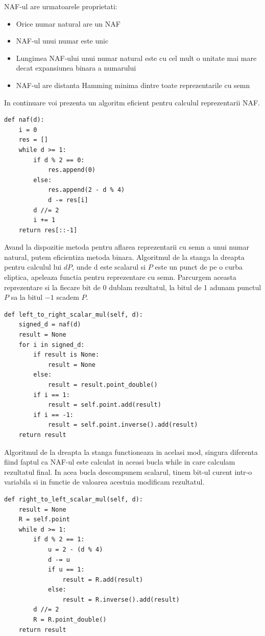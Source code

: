 \begin{teo}
NAF-ul are urmatoarele proprietati:
\begin{itemize}
  \item Orice numar natural are un NAF
  \item NAF-ul unui numar este unic
  \item Lungimea NAF-ului unui numar natural este cu cel mult o unitate mai mare decat expansiunea binara a numarului 
  \item NAF-ul are distanta Hamming minima dintre toate reprezentarile cu semn
\end{itemize}
\end{teo}

In continuare voi prezenta un algoritm eficient pentru calculul reprezentarii NAF.

\begin{lstlisting}
def naf(d):
    i = 0
    res = []
    while d >= 1:
        if d % 2 == 0:
            res.append(0)
        else:
            res.append(2 - d % 4)
            d -= res[i]
        d //= 2
        i += 1
    return res[::-1]
\end{lstlisting}

Avand la dispozitie metoda pentru aflarea reprezentarii cu semn a unui numar natural, putem eficientiza metoda binara. Algoritmul de la stanga la dreapta pentru calculul lui $dP$, unde d este scalarul si $P$ este un punct de pe o curba eliptica, apeleaza functia pentru reprezentare cu semn. Parcurgem aceasta reprezentare si la fiecare bit de 0 dublam rezultatul, la bitul de 1 adunam punctul $P$ sa la bitul $-1$ scadem $P$.

\begin{lstlisting}
def left_to_right_scalar_mul(self, d):
    signed_d = naf(d)
    result = None
    for i in signed_d:
        if result is None:
            result = None
        else:
            result = result.point_double()
        if i == 1:
            result = self.point.add(result)
        if i == -1:
            result = self.point.inverse().add(result)
    return result
\end{lstlisting}

Algoritmul de la dreapta la stanga functioneaza in acelasi mod, singura diferenta fiind faptul ca NAF-ul este calculat in aceasi bucla while in care calculam rezultatul final. In acea bucla descompunem scalarul, tinem bit-ul curent intr-o variabila si in functie de valoarea acestuia modificam rezultatul. 

\begin{lstlisting}
def right_to_left_scalar_mul(self, d):
    result = None
    R = self.point
    while d >= 1:
        if d % 2 == 1:
            u = 2 - (d % 4)
            d -= u
            if u == 1:
                result = R.add(result)
            else:
                result = R.inverse().add(result)
        d //= 2
        R = R.point_double()
    return result
\end{lstlisting}

